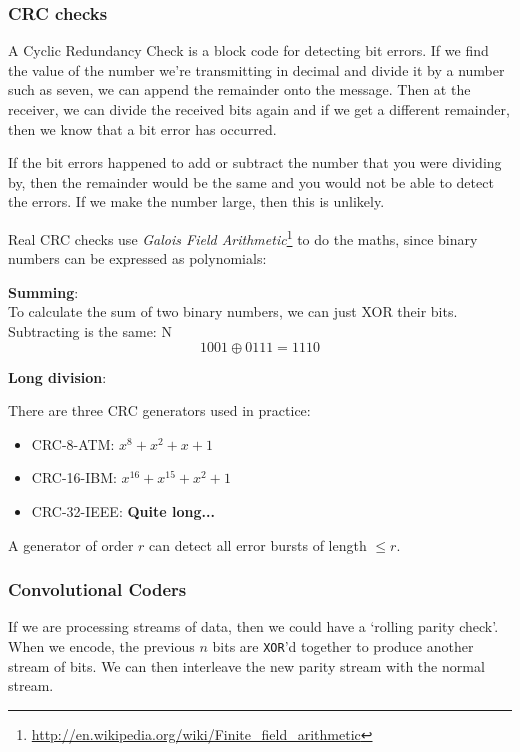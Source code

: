 \subsubsection{CRC checks}

A Cyclic Redundancy Check is a block code for detecting bit errors. If we find
the value of the number we're transmitting in decimal and divide it by a number
such as seven, we can append the remainder onto the message. Then at the
receiver, we can divide the received bits again and if we get a different
remainder, then we know that a bit error has occurred.

If the bit errors happened to add or subtract the number that you were dividing
by, then the remainder would be the same and you would not be able to detect the
errors. If we make the number large, then this is unlikely.

Real CRC checks use \textit{Galois Field Arithmetic}\footnote{
\url{http://en.wikipedia.org/wiki/Finite_field_arithmetic}} to do the maths,
since binary numbers can be expressed as polynomials:

\begin{description}
  \item \textbf{Summing}:\\
    To calculate the sum of two binary numbers, we can just XOR their bits.
    Subtracting is the same:
N
    \[
      1001 \oplus 0111 = 1110
    \]
  \item \textbf{Long division}:\\
\end{description}

There are three CRC generators used in practice:

\begin{itemize}
  \item CRC-8-ATM: $x^8 + x^2 + x + 1$
  \item CRC-16-IBM: $x^{16} + x^{15} + x^2 + 1$
  \item CRC-32-IEEE: \textbf{Quite long...}
\end{itemize}

A generator of order $r$ can detect all error bursts of length $\leq r$.

\subsubsection{Convolutional Coders}

If we are processing streams of data, then we could have a `rolling parity
check'. When we encode, the previous $n$ bits are \texttt{XOR}'d together to
produce another stream of bits. We can then interleave the new parity stream
with the normal stream.

